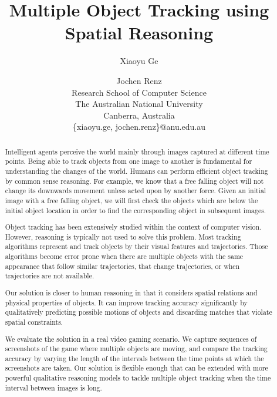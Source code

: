 \documentclass[letterpaper]{article}
\title{Multiple Object Tracking using Spatial Reasoning}
\author{Xiaoyu Ge \and Jochen Renz \\
Research School of Computer Science\\
The Australian National University \\
Canberra, Australia\\
\{xiaoyu.ge, jochen.renz\}@anu.edu.au
}
\begin{document}
\maketitle    
\begin{abstract}
Intelligent agents perceive the world mainly through images captured at  different time points. Being able to track objects from one image to another is fundamental for understanding the changes of the world. 
Humans can perform efficient object tracking by common sense reasoning. For example, we know that a free falling object will not change its downwards movement unless acted upon by another force. Given an initial image with a free falling object, we will first check the objects which are below the initial object location in order to find the corresponding object in subsequent images. 

Object tracking has been extensively studied within the context of computer vision. However, reasoning is typically not used to solve this problem. Most tracking algorithms represent and track objects by their visual features and trajectories. Those algorithms become error prone when there are multiple objects with the same appearance that follow similar trajectories, that change trajectories, or when trajectories are not available. 


Our solution is closer to human reasoning in that it considers spatial relations and physical properties of objects. It can improve tracking accuracy significantly by qualitatively predicting possible motions of objects and discarding matches that violate spatial constraints. 

We evaluate the solution in a real video gaming scenario. We capture sequences of screenshots of the game where multiple objects are moving, and compare the tracking accuracy by varying the length of the intervals between the time points at which the screenshots are taken. Our solution is flexible enough that can be extended with more powerful qualitative reasoning models to tackle multiple object tracking when the time interval between images is long. 
\end{abstract}
\end{document}
